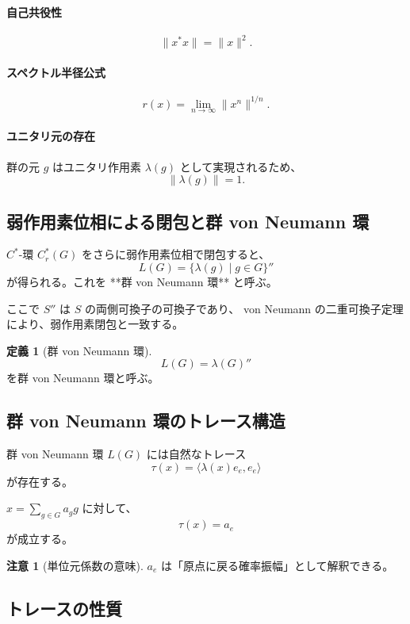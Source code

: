\documentclass[12pt,a4paper]{ltjarticle}
\theoremstyle{definition}
\newtheorem*{definition}{定義}
\newtheorem*{remark}{注意}
\begin{document}
\paragraph{自己共役性}
\[
\|x^*x\| = \|x\|^2.
\]

\paragraph{スペクトル半径公式}
\[
r(x) = \lim_{n \to \infty} \|x^n\|^{1/n}.
\]

\paragraph{ユニタリ元の存在}
群の元 $g$ はユニタリ作用素 $\lambda(g)$ として実現されるため、
\[
\|\lambda(g)\| = 1.
\]

\subsection{弱作用素位相による閉包と群 von Neumann 環}

$C^*$-環 $C^*_r(G)$ をさらに弱作用素位相で閉包すると、
\[
L(G) = \{\lambda(g) \mid g \in G\}''
\]
が得られる。これを **群 von Neumann 環** と呼ぶ。

ここで $S''$ は $S$ の両側可換子の可換子であり、
von Neumann の二重可換子定理により、弱作用素閉包と一致する。

\begin{definition}[群 von Neumann 環]
\[
L(G)=\lambda(G)''
\]
を群 von Neumann 環と呼ぶ。
\end{definition}

\subsection{群 von Neumann 環のトレース構造}

群 von Neumann 環 $L(G)$ には自然なトレース
\[
\tau(x) = \langle \lambda(x)e_e, e_e \rangle
\]
が存在する。

$x = \sum_{g \in G} a_g g$ に対して、
\[
\tau(x) = a_e
\]
が成立する。

\begin{remark}[単位元係数の意味]
$a_e$ は「原点に戻る確率振幅」として解釈できる。
\end{remark}

\subsection{トレースの性質}
\end{document}
